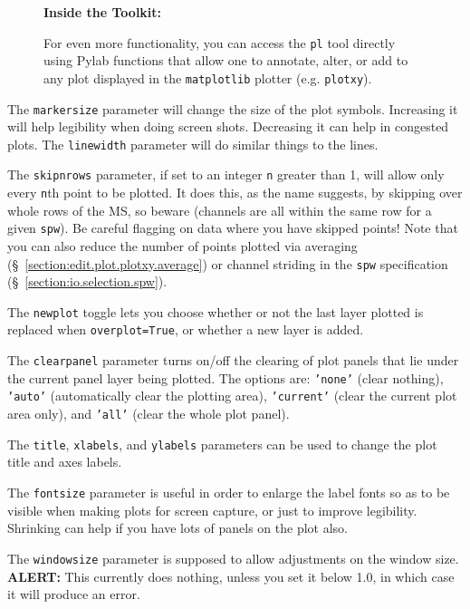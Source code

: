 \begin{wrapfigure}{r}{2.5in}
  \begin{boxedminipage}{2.5in}
     \centerline{\bf Inside the Toolkit:}
        For even more functionality, you can access the 
        {\tt pl} tool directly using Pylab functions that 
        allow one to annotate, alter, or add
        to any plot displayed in the {\tt matplotlib} plotter 
        (e.g. {\tt plotxy}).
  \end{boxedminipage}
\end{wrapfigure}

The {\tt markersize} parameter will change the size of the plot
symbols.  Increasing it will help legibility when doing screen shots.
Decreasing it can help in congested plots.  The {\tt linewidth}
parameter will do similar things to the lines.

The {\tt skipnrows} parameter, if set to an integer {\tt n} greater than 1,
will allow only every {\tt n}th point to be plotted.  It does this,
as the name suggests, by skipping over whole rows of the MS, so beware
(channels are all within the same row for a given {\tt spw}).  Be
careful flagging on data where you have skipped points!  Note
that you can also reduce the number of points plotted via averaging
(\S~\ref{section:edit.plot.plotxy.average}) or channel striding in the 
{\tt spw} specification (\S~\ref{section:io.selection.spw}).

The {\tt newplot} toggle lets you choose whether or not the
last layer plotted is replaced when {\tt overplot=True}, or whether
a new layer is added.

The {\tt clearpanel} parameter turns on/off the clearing of plot panels
that lie under the current panel layer being plotted. The options are:
{\tt 'none'} (clear nothing), {\tt 'auto'} (automatically clear the
plotting area), {\tt 'current'} (clear the current plot area only), 
and {\tt 'all'} (clear the whole plot panel).

The {\tt title}, {\tt xlabels}, and {\tt ylabels} parameters can
be used to change the plot title and axes labels.

The {\tt fontsize} parameter is useful in order to enlarge the label
fonts so as to be visible when making plots for screen capture, or
just to improve legibility.  Shrinking can help if you have lots of
panels on the plot also.

The {\tt windowsize} parameter is supposed to allow adjustments on
the window size. {\bf ALERT:} This currently does nothing,
unless you set it below 1.0, in which case it will produce an 
error.

